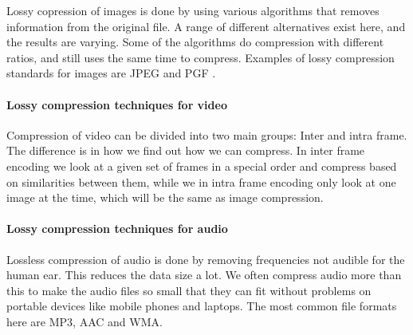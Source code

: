 Lossy copression of images is done by using various algorithms that removes information from the original file. A range of different alternatives exist here, and the results are varying. Some of the algorithms do compression with different ratios, and still uses the same time to compress. Examples of lossy compression standards for images are JPEG and PGF  \cite{bib:JPEG} \cite{bib:PGF}.  

\paragraph{Lossy compression techniques for video} \hfill \newline

Compression of video can be divided into two main groups: Inter and intra frame. The difference is in how we find out how we can compress. In inter frame encoding we look at a given set of frames in a special order and compress based on similarities between them, while we in intra frame encoding only look at one image at the time, which will be the same as image compression.\cite{bib:DV} \cite{bib:DV} \cite{bib:Dirac} \cite{bib:VC-1} 


\paragraph{Lossy compression techniques for audio}  \hfill \newline
Lossless compression of audio is done by removing frequencies not audible for the human ear. This reduces the data size a lot. We often compress audio more than this to make the audio files so small that they can fit without problems on portable devices like mobile phones and laptops. The most common file formats here are MP3, AAC and WMA.\cite{bib:MP3} \cite{bib:AAC} \cite{bib:WMA}

\newpage


